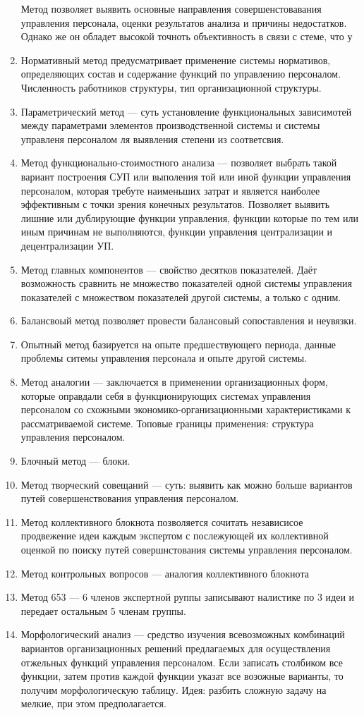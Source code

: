 \documentclass[a4paper,12pt,oneside,final]{extarticle}
\numberwithin{equation}{section}
\begin{document}
\begin{enumerate}
	Метод позволяет выявить основные направления совершенстовавания управления персонала, оценки результатов анализа и причины недостатков. Однако же он обладет высокой точноть  объективность в связи с стеме, что у 
	\item Нормативный метод предусматривает применение системы нормативов, определяющих состав и содержание функций по управлению персоналом. 
	Численность работников структуры, тип организационной структуры.
	\item Параметрический метод --- суть установление функциональных зависимотей между параметрами элементов производственной системы и системы управленя персоналом ля выявления степени из соответсвия. 
	\item Метод функционально-стоимостного анализа --- позволяет выбрать такой вариант построения СУП или выполения той или иной функции управления персоналом, которая требуте наименьших затрат и является наиболее эффективным с точки зрения конечных результатов. 
	Позволяет выявить лишние или дублирующие функции управления, функции которые по тем или иным причинам не выполняются, функции управления централизации и децентрализации УП. 
	\item Метод главных компонентов --- свойство десятков показателей. 
	Даёт возможность сравнить не множество показателей одной системы управления показателей с множеством показателей другой системы,  а только с одним.
	\item Балансвоый метод позволяет провести балансовый сопоставления и неувязки. 
	\item  Опытный метод базируется на опыте предшествующего периода, данные проблемы ситемы управления персонала и опыте другой системы.
	\item Метод аналогии --- заключается в применении организационных форм, которые оправдали себя в функционирующих системах управления персоналом со схожными экономико-организационными характеристиками к рассматриваемой системе. 
	Топовые границы применения: структура управления персоналом.
	\item Блочный метод --- блоки.  
	\item Метод творческий совещаний --- суть: выявить как можно больше вариантов путей  совершенствования управления персоналом. 
	\item Метод коллективного блокнота позволяется сочитать независисое продвежение идеи каждым экспертом с послежующей их коллективной оценкой по поиску путей совершнстования системы управления персоналом. 
	\item Метод контрольных вопросов --- аналогия коллективного блокнота
	\item Метод 653 --- 6 членов экспертной руппы записывают налистике по 3 идеи и передает остальным 5 членам группы.
	\item Морфологический анализ --- средство изучения всевозможных комбинаций вариантов организационных решений предлагаемых для осуществления отжельных функций управления персоналом. 
	Если записать столбиком все функции, затем против каждой функции указат все возожные варианты, то получим морфологическую таблицу. 
	Идея: разбить сложную задачу на мелкие, при этом предполагается.
\end{enumerate}
\end{document}
